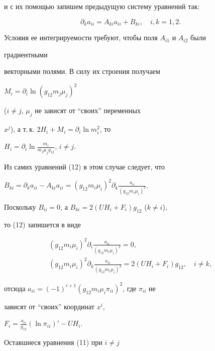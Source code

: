и с их помощью запишем предыдущую систему уравнений так: 


\begin{equation} 


\partial_k a_{ii}=A_{ki}a_{ii}+B_{ki},\quad i,k=1,2. 


\end{equation} 


Условия ее интегрируемости требуют, чтобы поля $A_{i1}$ и $A_{i2}$ были 


градиентными 


векторными полями. В силу их строения получаем 


$M_i=\partial_i\ln(g_{12}m_j\mu_j)^2$ 


($i\ne j$, $\mu_j$ не зависят от ``своих'' переменных 


$x^j$), а т.\,к. $2H_i+M_i=\partial_i\ln m^2_i$, то 


$H_i=\partial_i\ln\frac{m_i}{m_j\mu_j g_{12}}$, $i\ne j$. 


Из самих уравнений (12) в этом случае следует, что 


$B_{ki}=\partial_k a_{ii}-A_{ki}a_{ii}=(g_{12}m_i\mu_i)^2 


\partial_k\frac{a_{ii}}{(g_{12}m_i\mu_i)^2}$. 


Поскольку $B_{ii}=0$, а $B_{ki}=2(U H_i+F_i)g_{12}$ ($k\ne i$), 


то (12) запишется в виде 


\begin{gather*} 


(g_{12}m_i\mu_i)^2\partial_i 


\frac{a_{ii}}{(g_{12}m_i\mu_i)^2}=0, \\ 


%


(g_{12}m_i\mu_i)^2\partial_k 


\frac{a_{ii}}{(g_{12}m_i\mu_i)^2}=2(U H_i+F_i)g_{12}, 


\quad i\ne k,


\end{gather*} 


отсюда $a_{ii}=(-1)^{i+1}(g_{12}m_i\mu_i\pi_{ii})^2$, где $\pi_{ii}$ не 


зависят от ``своих'' координат $x^i$, 


$F_i=\frac{a_{ii}}{g_{12}}(\ln\pi_{ii})'-U H_i$. 


 


Оставшиеся уравнения (11) при $i\ne j$  


